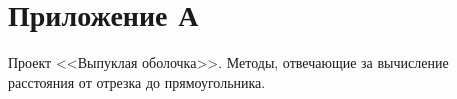 \section{Приложение А}

Проект <<Выпуклая оболочка>>. Методы, отвечающие за вычисление расстояния от отрезка до прямоугольника.


